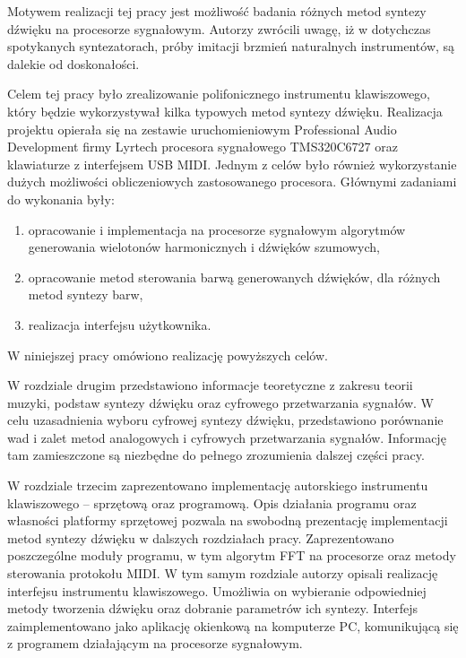 Motywem realizacji tej pracy jest możliwość badania różnych metod syntezy dźwięku na procesorze sygnałowym. 
Autorzy zwrócili uwagę, iż w dotychczas spotykanych syntezatorach, próby imitacji brzmień naturalnych instrumentów, są dalekie od doskonałości.

Celem tej pracy było zrealizowanie polifonicznego instrumentu klawiszowego, który będzie wykorzystywał kilka typowych metod syntezy dźwięku. Realizacja projektu opierała się na zestawie uruchomieniowym Professional Audio Development firmy Lyrtech procesora sygnałowego TMS320C6727 oraz klawiaturze z interfejsem USB MIDI. Jednym z celów było również wykorzystanie dużych możliwości obliczeniowych zastosowanego procesora. Głównymi zadaniami do wykonania były:

\begin{enumerate}
    \item opracowanie i implementacja na procesorze sygnałowym algorytmów generowania wielotonów harmonicznych i dźwięków szumowych,
    
    \item opracowanie metod sterowania barwą generowanych dźwięków, dla różnych metod syntezy barw,
    
    \item realizacja interfejsu użytkownika.
\end{enumerate}
W niniejszej pracy omówiono realizację powyższych celów.

W rozdziale drugim przedstawiono informacje teoretyczne z zakresu teorii muzyki, podstaw syntezy dźwięku oraz cyfrowego przetwarzania sygnałów. W celu uzasadnienia wyboru cyfrowej syntezy dźwięku, przedstawiono porównanie wad i zalet metod analogowych i cyfrowych przetwarzania sygnałów. Informację tam zamieszczone są niezbędne do pełnego zrozumienia dalszej części pracy.

W rozdziale trzecim zaprezentowano implementację autorskiego instrumentu klawiszowego – sprzętową oraz programową. Opis działania programu oraz własności platformy sprzętowej pozwala na swobodną prezentację implementacji metod syntezy dźwięku w dalszych rozdziałach pracy. Zaprezentowano poszczególne moduły programu, w tym algorytm FFT na procesorze oraz metody sterowania protokołu MIDI. W tym samym rozdziale autorzy opisali realizację interfejsu instrumentu klawiszowego. Umożliwia on wybieranie odpowiedniej metody tworzenia dźwięku oraz dobranie parametrów ich syntezy. Interfejs zaimplementowano jako aplikację okienkową na komputerze PC, komunikującą się z programem działającym na procesorze sygnałowym.

